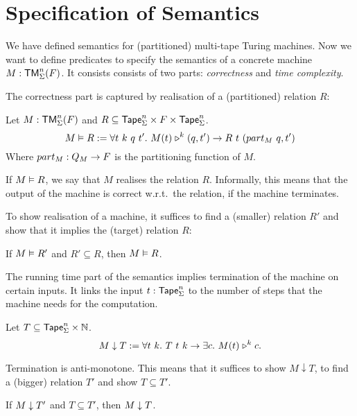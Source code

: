 \section{Specification of Semantics}
\label{sec:spec_semantics}

We have defined semantics for (partitioned) multi-tape Turing machines.  Now we want to define predicates to specify the semantics of a concrete
machine $M: \mathsf{TM}_\Sigma^n(F)$.  It consists consists of two parts: \emph{correctness} and \emph{time complexity}.

The correctness part is captured by realisation of a (partitioned) relation $R$:

\begin{definition}[Realisation][Realise]
  \label{def:realisation}
  Let $M:\mathsf{TM}_\Sigma^n(F)$ and $R \subseteq \mathsf{Tape}_\Sigma^n \times F \times \mathsf{Tape}_\Sigma^n$.
  \[
    M \mathrel{\vDash} R :=
    \forall t~k~q~t'.~M(t) \mathrel{\triangleright}^k (q, t') \rightarrow
    R~t~(part_M~q, t')
  \]
  Where $part_M : Q_M \rightarrow F$ is the partitioning function of $M$.
\end{definition}

If $M \mathrel{\vDash} R$, we say that $M$ realises the relation $R$.  Informally, this means that the output of the machine is correct w.r.t.\ the relation,
if the machine terminates.

To show realisation of a machine, it suffices to find a (smaller) relation $R'$ and show that it implies the (target) relation $R$:
\begin{lemma}
  \label{lem:Realise_monotone}
  If $M \mathrel{\vDash} R'$ and $R' \subseteq R$, then $M \mathrel{\vDash} R$.
\end{lemma}

The running time part of the semantics implies termination of the machine on certain inputs.  It links the input $t:\mathsf{Tape}_\Sigma^n$ to the number of
steps that the machine needs for the computation.

\begin{definition}
  \label{def:TerminatesIn}
  Let $T \subseteq \mathsf{Tape}_\Sigma^n \times \mathbb{N}$.
  \[
    M \mathrel{\downarrow} T :=
    \forall t~k.~T~t~k \rightarrow
    \exists c.~M (t) \mathrel{\triangleright}^k c.
  \]
\end{definition}

Termination is anti-monotone.  This means that it suffices to show $M \downarrow T$, to find a (bigger) relation $T'$ and show $T \subseteq T'$.
\begin{lemma}
  \label{lem:TerminatesIn_monotone}
  If $M \mathrel{\downarrow} T'$ and $T \subseteq T'$, then $M \mathrel{\downarrow} T$.
\end{lemma}

